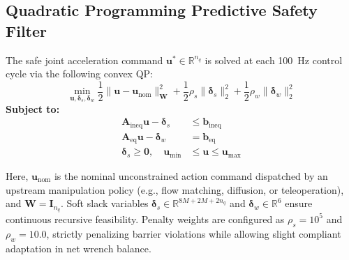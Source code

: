 \subsection{Quadratic Programming Predictive Safety Filter}
The safe joint acceleration command $\mathbf{u}^* \in \mathbb{R}^{n_q}$ is solved at each 100~Hz control cycle via the following convex QP:
\begin{equation}
    \min_{\mathbf{u}, \boldsymbol{\delta}_s, \boldsymbol{\delta}_w} \frac{1}{2} \|\mathbf{u} - \mathbf{u}_{\text{nom}}\|_{\mathbf{W}}^2 + \frac{1}{2} \rho_s \|\boldsymbol{\delta}_s\|_2^2 + \frac{1}{2} \rho_w \|\boldsymbol{\delta}_w\|_2^2
    \label{eq:safety_qp}
\end{equation}
\textbf{Subject to:}
\begin{align}
    \mathbf{A}_{\text{ineq}} \mathbf{u} - \boldsymbol{\delta}_s &\le \mathbf{b}_{\text{ineq}} \label{eq:qp_ineq} \\
    \mathbf{A}_{\text{eq}} \mathbf{u} - \boldsymbol{\delta}_w &= \mathbf{b}_{\text{eq}} \label{eq:qp_eq} \\
    \boldsymbol{\delta}_s \ge \mathbf{0}, \quad \mathbf{u}_{\min} &\le \mathbf{u} \le \mathbf{u}_{\max} \label{eq:qp_bounds}
\end{align}

Here, $\mathbf{u}_{\text{nom}}$ is the nominal unconstrained action command dispatched by an upstream manipulation policy (e.g., flow matching, diffusion, or teleoperation), and $\mathbf{W} = \mathbf{I}_{n_q}$. Soft slack variables $\boldsymbol{\delta}_s \in \mathbb{R}^{8M + 2M + 2n_q}$ and $\boldsymbol{\delta}_w \in \mathbb{R}^6$ ensure continuous recursive feasibility. Penalty weights are configured as $\rho_s = 10^5$ and $\rho_w = 10.0$, strictly penalizing barrier violations while allowing slight compliant adaptation in net wrench balance.

